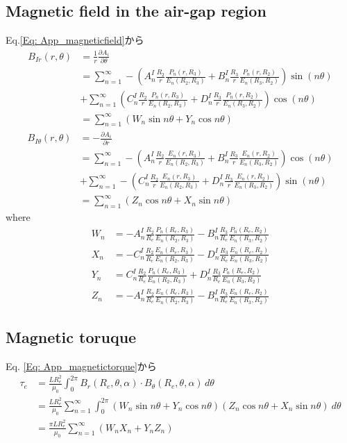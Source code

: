 \documentclass[a4paper, 11pt]{article}
\begin{document}
\subsection{Magnetic field in the air-gap region}
Eq.\eqref{Eq: App_magneticfield}から
\begin{align}
    B_{Ir}(r, \theta) & =  \frac{1}{r}\frac{\partial A_i}{\partial \theta} \\
    & = \sum_{n=1}^{\infty} -\left(A_n^I \frac{R_2}{r} \frac{P_n(r, R_3)}{E_n(R_2, R_3)} + B_n^I \frac{R_3}{r} \frac{P_n(r, R_2)}{E_n(R_3, R_2)}\right) \sin(n\theta)\nonumber \\
& + \sum_{n=1}^{\infty} \left(C_n^I \frac{R_2}{r} \frac{P_n(r, R_3)}{E_n(R_2, R_3)} + D_n^I \frac{R_3}{r} \frac{P_n(r, R_2)}{E_n(R_3, R_2)}\right) \cos(n\theta)\\
& = \sum_{n=1}^{\infty} (W_n\sin n\theta + Y_n \cos n\theta)
\end{align}
\begin{align}
    B_{I\theta}(r, \theta) & = -\frac{\partial A_i}{\partial r}\\
    & = \sum_{n=1}^{\infty} -\left(A_n^I \frac{R_2}{r} \frac{E_n(r, R_3)}{E_n(R_2, R_3)} + B_n^I \frac{R_3}{r} \frac{E_n(r, R_2)}{E_n(R_3, R_2)}\right) \cos(n\theta)\nonumber \\
& + \sum_{n=1}^{\infty} -\left(C_n^I \frac{R_2}{r} \frac{E_n(r, R_3)}{E_n(R_2, R_3)} + D_n^I \frac{R_3}{r} \frac{E_n(r, R_2)}{E_n(R_3, R_2)}\right) \sin(n\theta)\\
& = \sum_{n=1}^{\infty} (Z_n\cos n\theta + X_n \sin n\theta)
\end{align}
\color{ForestGreen}
where
\begin{align}
    W_n &= -A_n^I \frac{R_2}{R_e} \frac{P_n(R_e, R_3)}{E_n(R_2, R_3)} - B_n^I \frac{R_3}{R_e} \frac{P_n(R_e, R_2)}{E_n(R_3, R_2)} \\
X_n &= -C_n^I \frac{R_2}{R_e} \frac{E_n(R_e, R_3)}{E_n(R_2, R_3)} - D_n^I \frac{R_3}{R_e} \frac{E_n(R_e, R_2)}{E_n(R_3, R_2)} \\
Y_n &= C_n^I \frac{R_2}{R_e} \frac{P_n(R_e, R_3)}{E_n(R_2, R_3)} + D_n^I \frac{R_3}{R_e} \frac{P_n(R_e, R_2)}{E_n(R_3, R_2)} \\
Z_n &= -A_n^I \frac{R_2}{R_e} \frac{E_n(R_e, R_3)}{E_n(R_2, R_3)} - B_n^I \frac{R_3}{R_e} \frac{E_n(R_e, R_2)}{E_n(R_3, R_2)}
\end{align}

\color{Black}
\subsection{Magnetic toruque}
Eq. \eqref{Eq: App_magnetictorque}から
\begin{align}
    \tau_e & = \frac{L R_e^2}{\mu_0} \int_0^{2\pi} B_r(R_e, \theta, \alpha) \cdot B_\theta(R_e, \theta, \alpha) \, d\theta \\ 
    & =  \frac{L R_e^2}{\mu_0} \sum_{n=1}^{\infty} \int_0^{2\pi} (W_n\sin n\theta + Y_n \cos n\theta)(Z_n\cos n\theta + X_n \sin n\theta)~d\theta \\
    & =  \frac{\pi L R_e^2}{\mu_0} \sum_{n=1}^{\infty}  (W_nX_n + Y_nZ_n)
\end{align}
\end{document}
